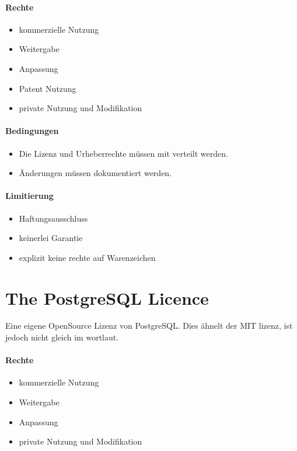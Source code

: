 \paragraph{Rechte}
\begin{itemize}
    \item kommerzielle Nutzung
    \item Weitergabe
    \item Anpassung
    \item Patent Nutzung %
    \item private Nutzung und Modifikation
\end{itemize}

\paragraph{Bedingungen}
\begin{itemize}
    \item Die Lizenz und Urheberrechte müssen mit verteilt werden.
    \item Änderungen müssen dokumentiert werden.
\end{itemize}

\paragraph{Limitierung}
\begin{itemize}
    \item Haftungsausschluss
    \item keinerlei Garantie
    \item explizit keine rechte auf Warenzeichen
\end{itemize}

\section{The PostgreSQL Licence}\label{sec:the-postgresql-licence}
Eine eigene OpenSource Lizenz von PostgreSQL.
Dies ähnelt der MIT lizenz, ist jedoch nicht gleich im wortlaut.

\paragraph{Rechte}
\begin{itemize}
    \item kommerzielle Nutzung
    \item Weitergabe
    \item Anpassung
    \item private Nutzung und Modifikation
\end{itemize}

